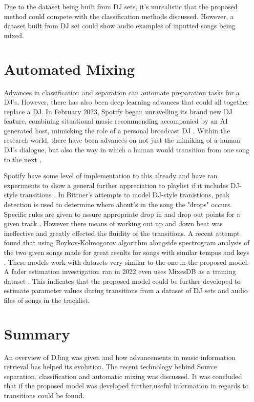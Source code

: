 Due to the dataset being built from DJ sets, it's unrealistic that the proposed method could compete with the classification methods discussed. However, a dataset built from DJ set could show audio examples of inputted songs being mixed.

\section{Automated Mixing}
Advances in classification and separation can automate preparation tasks for a DJ's. However, there has also been deep learning advances that could all together replace a DJ. In February 2023, Spotify began unravelling its brand new DJ feature, combining situational music recommending accompanied by an AI generated host, mimicking the role of a personal broadcast DJ \citep{naomi_spotify_2023}. Within the research world, there have been advances on not just the mimiking of a human DJ's dialogue, but also the way in which a human would transition from one song to the next \citep{chen_automatic_2022}.

Spotify have some level of implementation to this already and have ran experiments to show a general further appreciation to playlist if it includes DJ-style transitions \citep{bittner_automatic_2017}. In Bittner's  attempts to model DJ-style tranistions, peak detection is used to determine where about's in the song the "drops" occurs. Specific rules are given to assure appropriate drop in and drop out points for a given track \citep{bittner_automatic_2017}.  However there means of working out up and down beat was ineffective and greatly effected the fluidity of the transitions. A recent attempt found that using Boykov-Kolmogorov algorithm alongside spectrogram analysis of the two given songs made for great results for songs with similar tempos and keys \citep{robinson_automated_2023}. These models work with datasets very similar to the one in the proposed model. A fader estimation investigation ran in 2022 even uses MixesDB as a training dataset \citep{kim_joint_2022}. This indicates that the proposed model could be further developed to estimate parameter values during transitions from a dataset of DJ sets and audio files of songs in the tracklist.

\section{Summary}
An overview of DJing was given and how advancements in music information retrieval has helped its evolution. The recent technology behind Source separation, classification and automatic mixing was discussed. It was concluded that if the proposed model was developed further,useful information in regards to transitions could be found.

